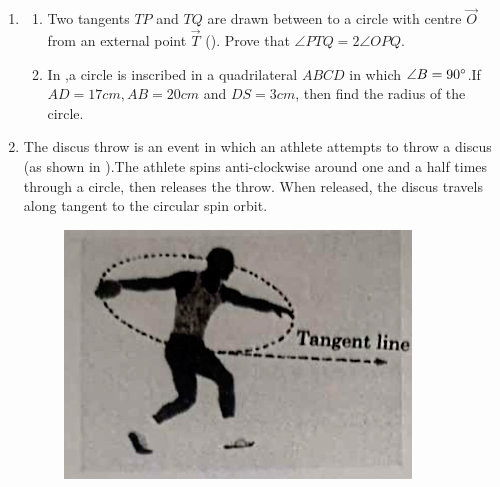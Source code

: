 \documentclass[12pt,A4 paper]{article}
\begin{document}
\begin{enumerate}
\begin{table}[!ht]
	        \centering
	        
		\caption{}
		\label{tab:tab:2}
        \end{table}






\item
  \begin{enumerate}
	  \item Two tangents $TP$ and $TQ$ are drawn between to a circle with centre $\vec{O}$ from an external point $\vec{T}$ (). Prove that $\angle PTQ = 2 \angle OPQ$.
\begin{figure}[h]
	        \centering
	        
		\caption{}
		\label{fig:fig:5}
        \end{figure}





\item In ,a circle is inscribed in a quadrilateral $ABCD$ in which $\angle B =90\degree$.If $AD=17cm,AB=20cm$ and $DS=3cm$, then find the radius of the circle.

\begin{figure}[h]
	        \centering
	        
		\caption{}
		\label{fig:fig:6}
\end{figure}
   \end{enumerate}






\item The discus throw is an event in which an athlete attempts to throw a discus (as shown in ).The athlete spins anti-clockwise around one and a half times through a circle, then releases the throw. When released, the discus travels along tangent to the circular spin orbit.


\begin{figure}[H]	
	        \centering
		\includegraphics[width=\columnwidth]{figs/fig0.png}
		\caption{}
		\label{fig:fig:0}
\end{figure}




\end{enumerate}
\end{document}
